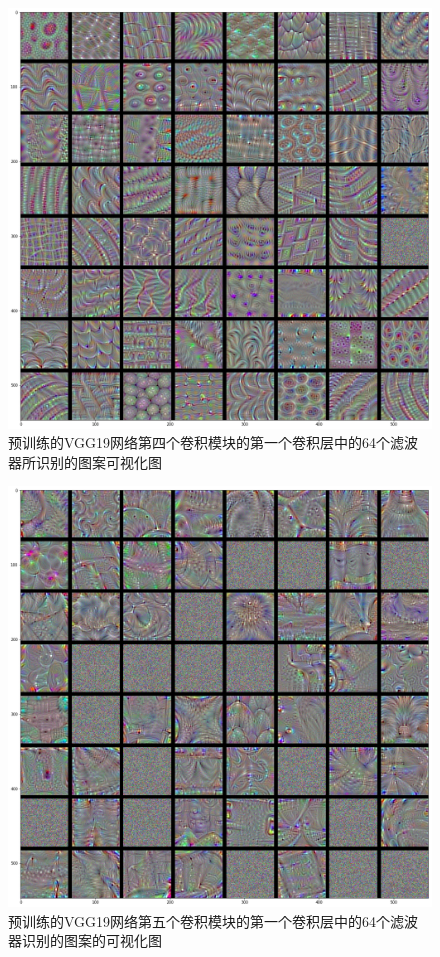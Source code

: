 \documentclass[lang=cn,11pt]{elegantpaper}
\begin{document}
\begin{figure}[hbtp]
\centering
  \includegraphics[width=0.8\linewidth]{block4_conv1}
  \caption{预训练的VGG19网络第四个卷积模块的第一个卷积层中的64个滤波器所识别的图案可视化图\label{fig:filter4}}
\end{figure}

\begin{figure}[hbtp]
\centering
  \includegraphics[width=0.8\linewidth]{block5_conv1.png}
  \caption{预训练的VGG19网络第五个卷积模块的第一个卷积层中的64个滤波器识别的图案的可视化图\label{fig:filter5}}
\end{figure}
\end{document}
